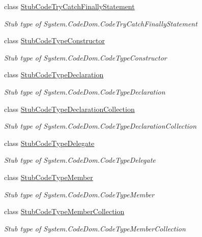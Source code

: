 \begin{DoxyCompactItemize}
class \hyperlink{class_system_1_1_code_dom_1_1_fakes_1_1_stub_code_try_catch_finally_statement}{Stub\-Code\-Try\-Catch\-Finally\-Statement}
\begin{DoxyCompactList}\small\item\em Stub type of System.\-Code\-Dom.\-Code\-Try\-Catch\-Finally\-Statement\end{DoxyCompactList}\item 
class \hyperlink{class_system_1_1_code_dom_1_1_fakes_1_1_stub_code_type_constructor}{Stub\-Code\-Type\-Constructor}
\begin{DoxyCompactList}\small\item\em Stub type of System.\-Code\-Dom.\-Code\-Type\-Constructor\end{DoxyCompactList}\item 
class \hyperlink{class_system_1_1_code_dom_1_1_fakes_1_1_stub_code_type_declaration}{Stub\-Code\-Type\-Declaration}
\begin{DoxyCompactList}\small\item\em Stub type of System.\-Code\-Dom.\-Code\-Type\-Declaration\end{DoxyCompactList}\item 
class \hyperlink{class_system_1_1_code_dom_1_1_fakes_1_1_stub_code_type_declaration_collection}{Stub\-Code\-Type\-Declaration\-Collection}
\begin{DoxyCompactList}\small\item\em Stub type of System.\-Code\-Dom.\-Code\-Type\-Declaration\-Collection\end{DoxyCompactList}\item 
class \hyperlink{class_system_1_1_code_dom_1_1_fakes_1_1_stub_code_type_delegate}{Stub\-Code\-Type\-Delegate}
\begin{DoxyCompactList}\small\item\em Stub type of System.\-Code\-Dom.\-Code\-Type\-Delegate\end{DoxyCompactList}\item 
class \hyperlink{class_system_1_1_code_dom_1_1_fakes_1_1_stub_code_type_member}{Stub\-Code\-Type\-Member}
\begin{DoxyCompactList}\small\item\em Stub type of System.\-Code\-Dom.\-Code\-Type\-Member\end{DoxyCompactList}\item 
class \hyperlink{class_system_1_1_code_dom_1_1_fakes_1_1_stub_code_type_member_collection}{Stub\-Code\-Type\-Member\-Collection}
\begin{DoxyCompactList}\small\item\em Stub type of System.\-Code\-Dom.\-Code\-Type\-Member\-Collection\end{DoxyCompactList}\item 

\end{DoxyCompactItemize}
